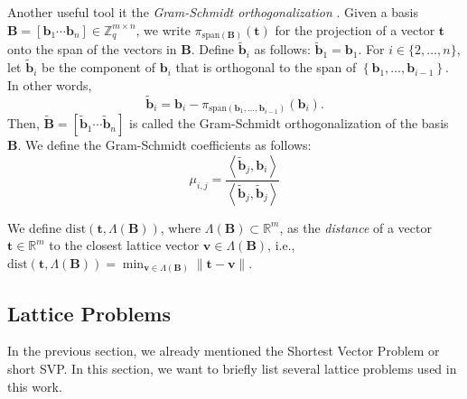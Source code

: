 Another useful tool it the \textit{Gram-Schmidt orthogonalization} \label{sec:gram-schmidt}. Given a basis $\mathbf{B} = \left[\mathbf{b}_1 \cdots \mathbf{b}_n\right] \in \mathbb{Z}_q^{m\times n}$, we write $\pi_{\text{span}(\mathbf{B})}(\mathbf{t})$ for the projection of a vector $\mathbf{t}$ onto the span of the vectors in $\mathbf{B}$.
Define $\tilde{\mathbf{b}}_i$ as follows: $\tilde{\mathbf{b}}_1 = \mathbf{b}_1$. For $i \in \{2, \ldots, n\}$, let $\tilde{\mathbf{b}}_i$ be the component of $\mathbf{b}_i$ that is orthogonal to the span of $\left\{\mathbf{b}_1, \ldots, \mathbf{b}_{i-1}\right\}$. In other words,
\begin{equation}
    \tilde{\mathbf{b}}_i = \mathbf{b}_i - \pi_{\text{span}(\mathbf{b}_1, \ldots, \mathbf{b}_{i-1})}(\mathbf{b}_i).
\end{equation} %
Then,  $\tilde{\mathbf{B}} = \left[\tilde{\mathbf{b}}_1 \cdots \tilde{\mathbf{b}}_n\right]$ is called the Gram-Schmidt orthogonalization of the basis $\mathbf{B}$. We define the Gram-Schmidt coefficients as follows:
\begin{equation}
    \mu_{i, j} = \frac{\left\langle \tilde{\mathbf{b}}_j, \mathbf{b}_i\right\rangle}{\left\langle \tilde{\mathbf{b}}_j, \tilde{\mathbf{b}}_j\right\rangle}
\end{equation}


We define $\text{dist}(\mathbf{t}, \Lambda(\mathbf{B}))$, where $\Lambda(\mathbf{B}) \subset \mathbb{R}^m$, as the \textit{distance} of a vector $\mathbf{t} \in \mathbb{R}^m$ to the closest lattice vector $\mathbf{v} \in \Lambda(\mathbf{B})$, i.e., $\text{dist}(\mathbf{t}, \Lambda(\mathbf{B})) = \min_{\mathbf{v} \in \Lambda(\mathbf{B})}\|\mathbf{t} -  \mathbf{v}\|$.






\subsection{Lattice Problems}\label{sec:lattice-problems}
In the previous section, we already mentioned the Shortest Vector Problem or short SVP. In this section, we want to briefly list several lattice problems used in this work.

